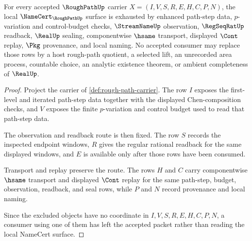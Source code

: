 \begin{theorem}
\label{thm:rough-path-namecert-obligations}
For every accepted $\RoughPathUp$ carrier $X=(I,V,S,R,E,H,C,P,N)$, the local $\NameCert_{\RoughPathUp}$ surface is exhausted by enhanced path-step data, $p$-variation and control-budget checks, $\StreamNameUp$ observation, $\RegSeqRatUp$ readback, $\RealUp$ sealing, componentwise $\hsame$ transport, displayed $\Cont$ replay, $\Pkg$ provenance, and local naming. No accepted consumer may replace those rows by a host rough-path quotient, a selected lift, an unrecorded area process, countable choice, an analytic existence theorem, or ambient completeness of $\RealUp$.
\end{theorem}
\begin{proof}
Project the carrier of \autoref{def:rough-path-carrier}. The row $I$ exposes the first-level and iterated path-step data together with the displayed Chen-composition checks, and $V$ exposes the finite $p$-variation and control budget used to read that path-step data.

The observation and readback route is then fixed. The row $S$ records the inspected endpoint windows, $R$ gives the regular rational readback for the same displayed windows, and $E$ is available only after those rows have been consumed.

Transport and replay preserve the route. The rows $H$ and $C$ carry componentwise $\hsame$ transport and displayed $\Cont$ replay for the same path-step, budget, observation, readback, and seal rows, while $P$ and $N$ record provenance and local naming.

Since the excluded objects have no coordinate in $I,V,S,R,E,H,C,P,N$, a consumer using one of them has left the accepted packet rather than reading the local NameCert surface.
\end{proof}

